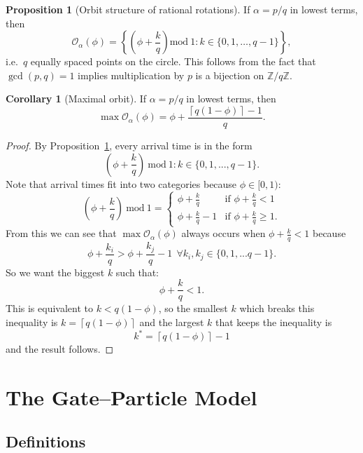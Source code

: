 \documentclass{article}
\theoremstyle{definition}
\newtheorem{proposition}{Proposition}[section]
\newtheorem{corollary}{Corollary}[section]
\newcommand{\travelTime}{ \alpha }
\newcommand{\phase}{ \phi }
\newcommand{\modx}{ \text{mod} \ }
\newcommand{\orbit}[2]{ \mathcal{O}_#1(#2) }
\begin{document}
\begin{proposition}[Orbit structure of rational rotations]
If $\travelTime = p/q$ in lowest terms, then
    \[
    \orbit{\travelTime}{\phase} = \left\{\left(\phase + \frac{k}{q}\right) \modx 1 : k \in \{0,1,\ldots,q-1\}\right\},
    \]
    i.e.\ $q$ equally spaced points on the circle. This follows from the fact that $\gcd(p,q)=1$ implies multiplication by $p$ is a bijection on $\mathbb{Z}/q\mathbb{Z}$.
\label{prop:rational_orbit}
\end{proposition}

\begin{corollary}[Maximal orbit]
If $\travelTime=p/q$ in lowest terms, then
\[
\max\orbit{\travelTime}{\phase} = \phase + \frac{\left\lceil q(1-\phase) \right\rceil - 1}{q}.
\]
\begin{proof}
    By Proposition~\ref{prop:rational_orbit}, every arrival time is in the form
    \[
        \left(\phase+\frac{k}{q}\right) \ \modx 1:k\in\{0,1,...,q-1\}.
    \]
    Note that arrival times fit into two categories because $\phase \in [0,1)$:
    \[
        \left(\phase+\frac{k}{q}\right) \ \modx 1=
        \begin{cases} 
        \phase+\frac{k}{q} & \text{if }\phase+\frac{k}{q} < 1 \\
        \phase+\frac{k}{q}-1 & \text{if }\phase+\frac{k}{q} \ge 1.
        \end{cases}
    \]
    From this we can see that $\max\orbit{\travelTime}{\phase}$ always occurs when $\phase+\frac{k}{q} < 1$ because
    \[
    \phase+\frac{k_i}{q} > \phase+\frac{k_j}{q}-1 \  \ \forall k_i,k_j\in\{0,1,...q-1\}.
    \]
    So we want the biggest $k$ such that:
    \[
    \phase + \frac{k}{q} < 1.
    \]
    This is equivalent to $k<q(1-\phase)$, so the smallest $k$ which breaks this inequality is $k=\left\lceil q(1-\phase) \right\rceil$ and the largest $k$ that keeps the inequality is
    \[
    k^*=\left\lceil q(1-\phase) \right\rceil-1
    \]
    and the result follows.
\end{proof}
\label{cor:max_travel_point}
\end{corollary}

\section{The Gate--Particle Model}

\subsection{Definitions}
\end{document}
